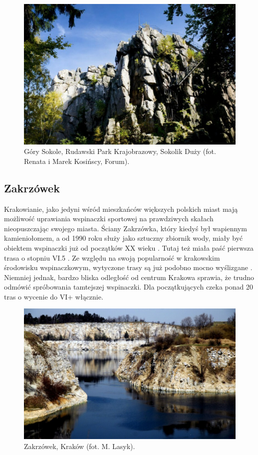 \documentclass{article}
\begin{document}
\begin{figure}[!htbp]
	\begin{center}
		\includegraphics[width=0.75\linewidth]{images/sokolik-duzy.eps}
	\end{center}
	\caption{Góry Sokole, Rudawski Park Krajobrazowy, Sokolik Duży (fot. Renata i Marek Kosińscy, Forum)\cite{eng-pol-wspin}.}
	\label{}
\end{figure}

\subsection{Zakrzówek}
Krakowianie, jako jedyni wśród mieszkańców większych polskich miast mają możliwość uprawiania wspinaczki sportowej na prawdziwych skałach nieopuszczając swojego miasta. Ściany Zakrzówka, który kiedyś był wapiennym kamieniołomem, a od 1990 roku służy jako sztuczny zbiornik wody, miały być obiektem wspinaczki już od początków XX wieku \cite{topo-zakrzowek}. Tutaj też miała paść pierwsza trasa o stopniu VI.5 \cite{topo-zakrzowek}. Ze względu na swoją popularność w krakowskim środowisku wspinaczkowym, wytyczone trasy są już podobno mocno wyślizgane \cite{podroze-se-wspin}. Niemniej jednak, bardzo bliska odległość od centrum Krakowa sprawia, że trudno odmówić spróbowania tamtejszej wspinaczki. Dla początkujących  czeka ponad 20 tras o wycenie do VI+ włącznie. 

\begin{figure}[!htbp]
	\begin{center}
		\includegraphics[width=0.75\linewidth]{images/zakrzowek.eps}
	\end{center}
	\caption{Zakrzówek, Kraków (fot. M. Lasyk)\cite{eng-pol-wspin}.}
	\label{zakrzowek}
\end{figure}

\pagebreak
\nocite{*}
\printbibliography
\end{document}
